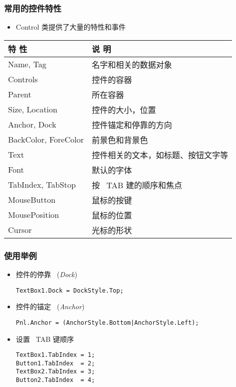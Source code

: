 \begin{frame}
\frametitle{常用的控件特性}
\begin{itemize}
\item Control 类提供了大量的特性和事件
\end{itemize}
\begin{tabular}{l|l}
\hline
特 性                & 说 明                              \\
\hline
Name, Tag            & 名字和相关的数据对象               \\
Controls             & 控件的容器                         \\
Parent               & 所在容器                           \\
\hline
Size, Location       & 控件的大小，位置                   \\
Anchor, Dock         & 控件锚定和停靠的方向               \\
BackColor, ForeColor & 前景色和背景色                     \\
\hline
Text                 & 控件相关的文本，如标题、按钮文字等 \\
Font                 & 默认的字体                         \\
\hline
TabIndex, TabStop    & 按 ~TAB 建的顺序和焦点             \\
MouseButton          & 鼠标的按键                         \\
MousePosition        & 鼠标的位置                         \\
Cursor               & 光标的形状                         \\
\hline
\end{tabular}
\end{frame}

\begin{frame}[fragile]
\frametitle{使用举例}
\begin{itemize}
\item 控件的停靠 ~(\textit{Dock})
\begin{lstlisting}
TextBox1.Dock = DockStyle.Top;
\end{lstlisting}
\item 控件的锚定 ~(\textit{Anchor})
\begin{lstlisting}
Pnl.Anchor = (AnchorStyle.Bottom|AnchorStyle.Left);
\end{lstlisting}
\item 设置 ~TAB 键顺序
\begin{lstlisting}
TextBox1.TabIndex = 1;
Button1.TabIndex  = 2;
TextBox2.TabIndex = 3;
Button2.TabIndex  = 4;
\end{lstlisting}
\end{itemize}
\end{frame}

